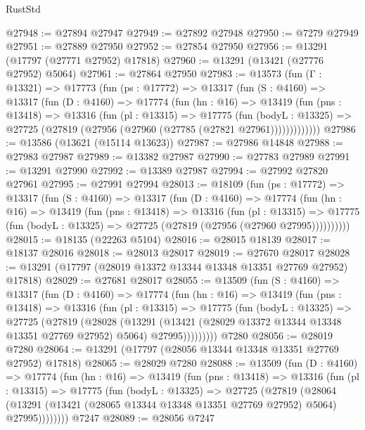 \begin{lexlean}{RustStd}
\begin{coremodule}
@27948 := @27894 @27947
@27949 := @27892 @27948
@27950 := @7279 @27949
@27951 := @27889 @27950
@27952 := @27854 @27950
@27956 := @13291 (@17797 (@27771 @27952) @17818)
@27960 := @13291 (@13421 (@27776 @27952) @5064)
@27961 := @27864 @27950
@27983 := @13573
    (fun (Γ : @13321) =>
    @17773
      (fun (ps : @17772) =>
      @13317
        (fun (S : @4160) =>
        @13317
          (fun (D : @4160) =>
          @17774
            (fun (hn : @16) =>
            @13419
              (fun (pns : @13418) =>
              @13316
                (fun (pl : @13315) =>
                @17775
                  (fun (bodyL : @13325) =>
                  @27725 (@27819 (@27956 (@27960 (@27785 (@27821 @27961)))))))))))))
@27986 := @13586 (@13621 (@15114 @13623))
@27987 := @27986 @14848
@27988 := @27983 @27987
@27989 := @13382 @27987
@27990 := @27783 @27989
@27991 := @13291 @27990
@27992 := @13389 @27987
@27994 := @27992 @27820 @27961
@27995 := @27991 @27994
@28013 := @18109
    (fun (ps : @17772) =>
    @13317
      (fun (S : @4160) =>
      @13317
        (fun (D : @4160) =>
        @17774
          (fun (hn : @16) =>
          @13419
            (fun (pns : @13418) =>
            @13316
              (fun (pl : @13315) =>
              @17775 (fun (bodyL : @13325) => @27725 (@27819 (@27956 (@27960 @27995))))))))))
@28015 := @18135 (@22263 @5104)
@28016 := @28015 @18139
@28017 := @18137 @28016
@28018 := @28013 @28017
@28019 := @27670 @28017
@28028 := @13291 (@17797 (@28019 @13372 @13344 @13348 @13351 @27769 @27952) @17818)
@28029 := @27681 @28017
@28055 := @13509
    (fun (S : @4160) =>
    @13317
      (fun (D : @4160) =>
      @17774
        (fun (hn : @16) =>
        @13419
          (fun (pns : @13418) =>
          @13316
            (fun (pl : @13315) =>
            @17775
              (fun (bodyL : @13325) =>
              @27725
                (@27819
                  (@28028
                    (@13291
                      (@13421 (@28029 @13372 @13344 @13348 @13351 @27769 @27952) @5064)
                      @27995)))))))))
    @7280
@28056 := @28019 @7280
@28064 := @13291 (@17797 (@28056 @13344 @13348 @13351 @27769 @27952) @17818)
@28065 := @28029 @7280
@28088 := @13509
    (fun (D : @4160) =>
    @17774
      (fun (hn : @16) =>
      @13419
        (fun (pns : @13418) =>
        @13316
          (fun (pl : @13315) =>
          @17775
            (fun (bodyL : @13325) =>
            @27725
              (@27819
                (@28064
                  (@13291 (@13421 (@28065 @13344 @13348 @13351 @27769 @27952) @5064) @27995))))))))
    @7247
@28089 := @28056 @7247

\end{coremodule}
\end{lexlean}
